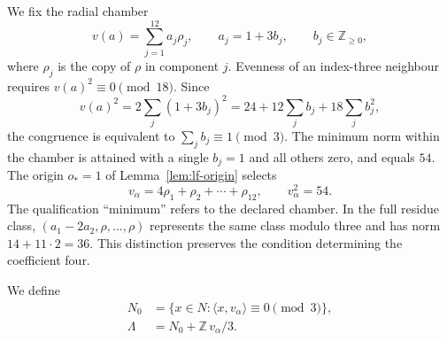 We fix the radial chamber
\[
 v(a)=\sum_{j=1}^{12}a_j\rho_j,\qquad
 a_j=1+3b_j,\qquad b_j\in\mathbb Z_{\geq0},
\]
where \(\rho_j\) is the copy of \(\rho\) in
component \(j\). Evenness of an index-three neighbour
requires \(v(a)^2\equiv0\pmod{18}\).
Since
\[
 v(a)^2=2\sum_j(1+3b_j)^2
       =24+12\sum_jb_j+18\sum_jb_j^2,
\]
the congruence is equivalent to \(\sum_jb_j\equiv1\pmod3\).
The minimum norm within the chamber is attained with
a single \(b_j=1\) and all others zero, and equals \(54\).
The origin \(o_*=1\) of Lemma~\ref{lem:lf-origin}
selects
\begin{equation}
 v_\alpha=4\rho_1+\rho_2+\cdots+\rho_{12},
 \qquad v_\alpha^2=54.
 \label{eq:lf-valpha}
\end{equation}
The qualification ``minimum'' refers to the declared
chamber. In the full residue class,
\((a_1-2a_2,\rho,\ldots,\rho)\) represents the
same class modulo three and has norm
\(14+11\cdot2=36\). This distinction preserves
the condition determining the coefficient four.

We define
\begin{equation}
\begin{split}
 N_0&=\{x\in N:\langle x,v_\alpha\rangle\equiv0\pmod3\},\\
 \Lambda&=N_0+\mathbb Z\,v_\alpha/3.
\end{split}
\label{eq:lf-lambda}
\end{equation}

